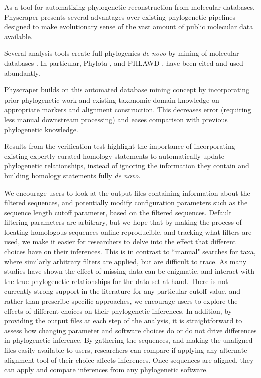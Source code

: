 \documentclass{bmcart}
\begin{document}
As a tool for automatizing phylogenetic reconstruction from molecular databases,
Physcraper presents several advantages over existing phylogenetic pipelines designed to
make evolutionary sense of the vast amount of
public molecular data available.

Several analysis tools create full phylogenies \textit{de novo} by mining of molecular
databases \cite{antonelli2017toward, sanderson2008phylota, smith2019pyphlawd,
bennett2018phylotar, pearse2013phylogenerator}.
In particular, Phylota \cite{sanderson2008phylota},
and PHLAWD \cite{smith2009mega}, have been cited and used abundantly.

Physcraper builds on this automated database mining concept by incorporating prior
phylogenetic work and existing taxonomic domain knowledge on appropriate markers
and alignment construction.
This decreases error (requiring less manual downstream processing) and
eases comparison with previous phylogenetic knowledge.

Results from the verification test highlight the importance of incorporating existing expertly
curated homology statements to automatically update phylogenetic relationships, instead
of ignoring the information they contain and building homology statements fully \textit{de novo}.

We encourage users to look at the output files containing information about the
filtered sequences, and potentially modify configuration parameters such as the
sequence length cutoff parameter, based on the filtered sequences.
Default filtering parameters are arbitrary, but we hope that by making the process
of locating homologous sequences online reproducible, and tracking what filters
are used, we make it easier for researchers to delve into the effect that different
choices have on their inferences.
This is in contrast to ``manual" searches for taxa, where similarly arbitrary filters
are applied, but are difficult to trace.
As many studies have shown \cite{huang_what_2009} the effect of missing data can
be enigmatic, and interact with the true phylogenetic relationships for the data
set at hand.
There is not currently strong support in the literature for any particular cutoff
value, and rather than prescribe specific approaches, we encourage users to explore
the effects of different choices on their phylogenetic inferences.
In addition, by providing the output files at each step of the analysis,
it is straightforward to assess how changing parameter and software choices do or
do not drive differences in phylogenetic inference.
By gathering the sequences, and making the unaligned files easily available to users,
researchers can compare if applying any alternate alignment tool of their choice
affects inferences.
Once sequences are aligned, they can apply and compare inferences from any phylogenetic
software.
\end{document}
